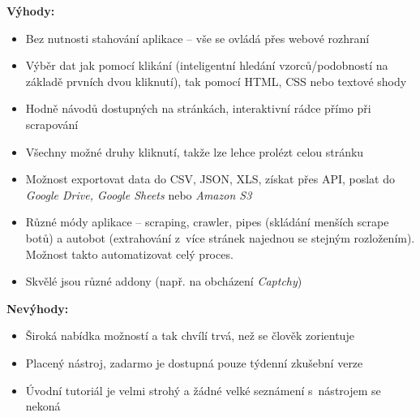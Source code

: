 \documentclass[thesis=B,czech]{FITthesis}[2012/06/26]
\begin{document}
\textbf{Výhody:}
\begin{itemize}
	\item Bez nutnosti stahování aplikace -- vše se ovládá přes webové rozhraní
	\item Výběr dat jak pomocí klikání (inteligentní hledání vzorců/podobností na základě prvních dvou kliknutí), tak pomocí HTML, CSS nebo textové shody
	\item Hodně návodů dostupných na stránkách, interaktivní rádce přímo při scrapování
	\item Všechny možné druhy kliknutí, takže lze lehce prolézt celou stránku
	\item Možnost exportovat data do CSV, JSON, XLS, získat přes API, poslat do \emph{Google Drive, Google Sheets} nebo \emph{Amazon S3}
	\item Různé módy aplikace -- scraping, crawler, pipes (skládání menších scrape botů) a autobot (extrahování z~více stránek najednou se stejným rozložením). Možnost takto automatizovat celý proces.
	\item Skvělé jsou různé addony (např. na obcházení \emph{Captchy})
\end{itemize}

\textbf{Nevýhody:}
\begin{itemize}
	\item Široká nabídka možností a tak chvílí trvá, než se člověk zorientuje
	\item Placený nástroj, zadarmo je dostupná pouze týdenní zkušební verze
	\item Úvodní tutoriál je velmi strohý a žádné velké seznámení s~nástrojem se nekoná
\end{itemize}
\end{document}
